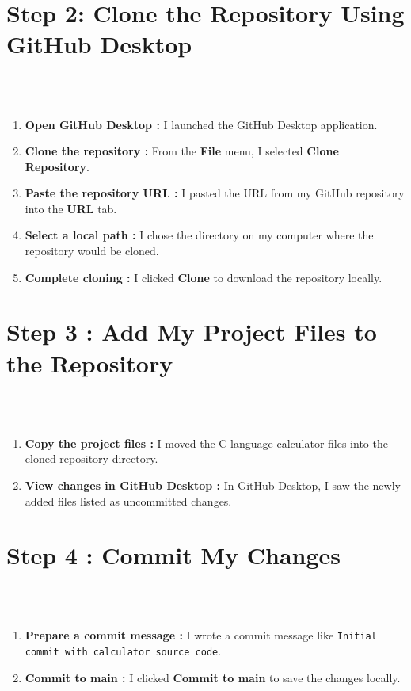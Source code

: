 \documentclass[12pt, a4paper]{article}
\begin{document}
\section*{Step 2: Clone the Repository Using GitHub Desktop}
\\\
\begin{enumerate}
     \item \textbf{Open GitHub Desktop :} I launched the GitHub Desktop application.
    \item \textbf{Clone the repository :} From the \textbf{File} menu, I selected \textbf{Clone Repository}.
    \item \textbf{Paste the repository URL :} I pasted the URL from my GitHub repository into the \textbf{URL} tab.
    \item \textbf{Select a local path :} I chose the directory on my computer where the repository would be cloned.
    \item \textbf{Complete cloning :} I clicked \textbf{Clone} to download the repository locally.

\end{enumerate}
\newpage
{}%
\vspace{-2cm}
\section*{Step 3 : Add My Project Files to the Repository}
\\\
\begin{enumerate}
 \item \textbf{Copy the project files :} I moved the C language calculator files into the cloned repository directory.
    \item \textbf{View changes in GitHub Desktop :} In GitHub Desktop, I saw the newly added files listed as uncommitted changes.

\end{enumerate}

\section*{Step 4 : Commit My Changes}
\\\
\begin{enumerate}
    \item \textbf{Prepare a commit message :} I wrote a commit message like \texttt{Initial commit with calculator source code}.
    \item \textbf{Commit to main :} I clicked \textbf{Commit to main} to save the changes locally.

\end{enumerate}
\end{document}
